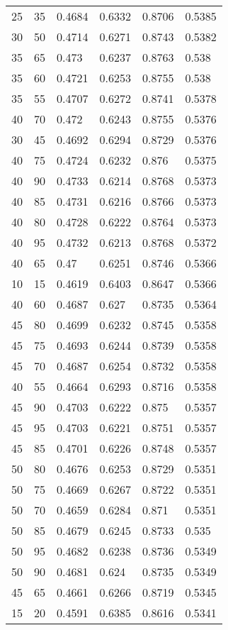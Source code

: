 \begin{center}
\begin{longtable}{|l|l|l|l|l|l|}
25 & 35 & 0.4684 & 0.6332 & 0.8706 & 0.5385 \\
30 & 50 & 0.4714 & 0.6271 & 0.8743 & 0.5382 \\
35 & 65 & 0.473  & 0.6237 & 0.8763 & 0.538  \\
35 & 60 & 0.4721 & 0.6253 & 0.8755 & 0.538  \\
35 & 55 & 0.4707 & 0.6272 & 0.8741 & 0.5378 \\
40 & 70 & 0.472  & 0.6243 & 0.8755 & 0.5376 \\
30 & 45 & 0.4692 & 0.6294 & 0.8729 & 0.5376 \\
40 & 75 & 0.4724 & 0.6232 & 0.876  & 0.5375 \\
40 & 90 & 0.4733 & 0.6214 & 0.8768 & 0.5373 \\
40 & 85 & 0.4731 & 0.6216 & 0.8766 & 0.5373 \\
40 & 80 & 0.4728 & 0.6222 & 0.8764 & 0.5373 \\
40 & 95 & 0.4732 & 0.6213 & 0.8768 & 0.5372 \\
40 & 65 & 0.47   & 0.6251 & 0.8746 & 0.5366 \\
10 & 15 & 0.4619 & 0.6403 & 0.8647 & 0.5366 \\
40 & 60 & 0.4687 & 0.627  & 0.8735 & 0.5364 \\
45 & 80 & 0.4699 & 0.6232 & 0.8745 & 0.5358 \\
45 & 75 & 0.4693 & 0.6244 & 0.8739 & 0.5358 \\
45 & 70 & 0.4687 & 0.6254 & 0.8732 & 0.5358 \\
40 & 55 & 0.4664 & 0.6293 & 0.8716 & 0.5358 \\
45 & 90 & 0.4703 & 0.6222 & 0.875  & 0.5357 \\
45 & 95 & 0.4703 & 0.6221 & 0.8751 & 0.5357 \\
45 & 85 & 0.4701 & 0.6226 & 0.8748 & 0.5357 \\
50 & 80 & 0.4676 & 0.6253 & 0.8729 & 0.5351 \\
50 & 75 & 0.4669 & 0.6267 & 0.8722 & 0.5351 \\
50 & 70 & 0.4659 & 0.6284 & 0.871  & 0.5351 \\
50 & 85 & 0.4679 & 0.6245 & 0.8733 & 0.535  \\
50 & 95 & 0.4682 & 0.6238 & 0.8736 & 0.5349 \\
50 & 90 & 0.4681 & 0.624  & 0.8735 & 0.5349 \\
45 & 65 & 0.4661 & 0.6266 & 0.8719 & 0.5345 \\
15 & 20 & 0.4591 & 0.6385 & 0.8616 & 0.5341 \\

\end{longtable}
\end{center}
